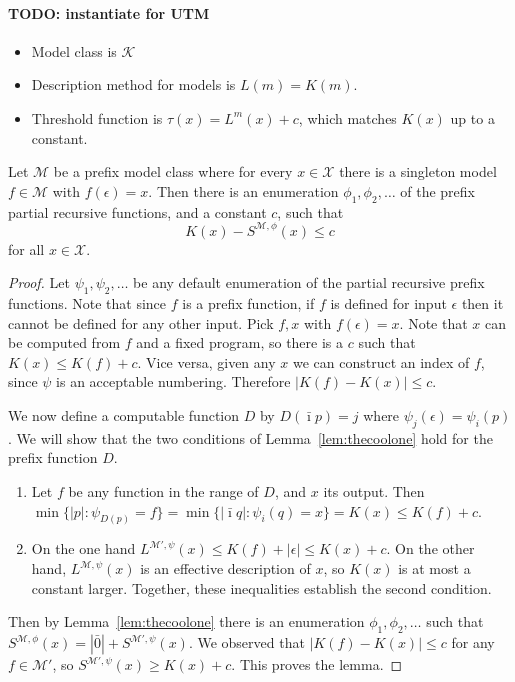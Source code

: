 \documentclass{style/llncs}
\newcommand{\M}{\mathscr M}
\newcommand{\K}{\mathscr K}
\newcommand{\X}{\mathscr X}
\begin{document}
\paragraph{TODO: instantiate for UTM}

\begin{itemize}
\item Model class is $\K$
\item Description method for models is $L(m)=K(m)$.
\item Threshold function is $\tau(x)=L^m(x)+c$, which matches $K(x)$
  up to a constant.
\end{itemize}


\begin{lemma}
Let $\M$ be a prefix model class where for every $x\in\X$ there is a singleton model $f\in\M$ with $f(\epsilon)=x$. Then there is an enumeration $\phi_1,\phi_2,\ldots$ of the prefix partial recursive functions, and a constant $c$, such that
\[
K(x)-S^{\M,\phi}(x)\le c
\]
for all $x\in\X$.
\end{lemma}
\begin{proof}
Let $\psi_1,\psi_2,\ldots$ be any default enumeration of the partial recursive prefix functions. Note that since $f$ is a prefix function, if $f$ is defined for input $\epsilon$ then it cannot be defined for any other input. Pick $f,x$ with $f(\epsilon)=x$. Note that $x$ can be computed from $f$ and a fixed program, so there is a $c$ such that $K(x)\le K(f)+c$. Vice versa, given any $x$ we can construct an index of $f$, since $\psi$ is an acceptable numbering. Therefore $|K(f)-K(x)|\le c$.

We now define a computable function $D$ by $D(\bar\imath p)=j$ where $\psi_j(\epsilon) = \psi_i(p)$.  We will show that the two conditions of Lemma~\ref{lem:thecoolone} hold for the prefix function $D$.

\begin{enumerate}
\item Let $f$ be any function in the range of $D$, and $x$ its output. Then $\min\{|p|:\psi_{D(p)}=f\}=\min\{|\bar\imath q|:\psi_i(q)=x\}=K(x)\le K(f)+c$.
\item On the one hand $L^{\M',\psi}(x)\le K(f)+|\epsilon|\le K(x)+c$. On the other hand, $L^{\M,\psi}(x)$ is an effective description of $x$, so $K(x)$ is at most a constant larger.
Together, these inequalities establish the second condition.
\end{enumerate}

Then by Lemma~\ref{lem:thecoolone} there is an enumeration $\phi_1,\phi_2,\ldots$ such that $S^{\M,\phi}(x)=|\bar 0|+S^{\M',\psi}(x)$. We observed that $|K(f)-K(x)|\le c$ for any $f\in\M'$, so $S^{\M',\psi}(x)\ge K(x)+c$. This proves the lemma.
\end{proof}
\end{document}
